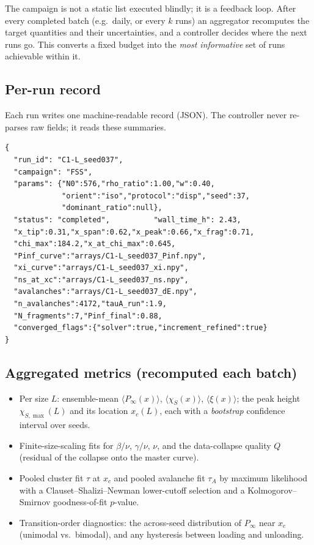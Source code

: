 \documentclass[11pt]{article}
\newcommand{\Pinf}{P_\infty}
\newcommand{\xc}{x_c}
\begin{document}
The campaign is not a static list executed blindly; it is a feedback loop. After every
completed batch (e.g.\ daily, or every $k$ runs) an aggregator recomputes the target
quantities and their uncertainties, and a controller decides where the next runs go.
This converts a fixed budget into the \emph{most informative} set of runs achievable
within it.

\subsection{Per-run record}

Each run writes one machine-readable record (JSON). The controller never re-parses raw
fields; it reads these summaries.
\begin{verbatim}
{
  "run_id": "C1-L_seed037",
  "campaign": "FSS",
  "params": {"N0":576,"rho_ratio":1.00,"w":0.40,
             "orient":"iso","protocol":"disp","seed":37,
             "dominant_ratio":null},
  "status": "completed",          "wall_time_h": 2.43,
  "x_tip":0.31,"x_span":0.62,"x_peak":0.66,"x_frag":0.71,
  "chi_max":184.2,"x_at_chi_max":0.645,
  "Pinf_curve":"arrays/C1-L_seed037_Pinf.npy",
  "xi_curve":"arrays/C1-L_seed037_xi.npy",
  "ns_at_xc":"arrays/C1-L_seed037_ns.npy",
  "avalanches":"arrays/C1-L_seed037_dE.npy",
  "n_avalanches":4172,"tauA_run":1.9,
  "N_fragments":7,"Pinf_final":0.88,
  "converged_flags":{"solver":true,"increment_refined":true}
}
\end{verbatim}

\subsection{Aggregated metrics (recomputed each batch)}

\begin{itemize}
\item Per size $L$: ensemble-mean $\langle\Pinf(x)\rangle$, $\langle\chi_S(x)\rangle$,
$\langle\xi(x)\rangle$; the peak height $\chi_{S,\max}(L)$ and its location
$x_c(L)$, each with a \emph{bootstrap} confidence interval over seeds.
\item Finite-size-scaling fits for $\beta/\nu$, $\gamma/\nu$, $\nu$, and the
data-collapse quality $Q$ (residual of the collapse onto the master curve).
\item Pooled cluster fit $\tau$ at $\xc$ and pooled avalanche fit $\tau_A$ by maximum
likelihood with a Clauset--Shalizi--Newman lower-cutoff selection and a
Kolmogorov--Smirnov goodness-of-fit $p$-value.
\item Transition-order diagnostics: the across-seed distribution of $\Pinf$ near $\xc$
(unimodal vs.\ bimodal), and any hysteresis between loading and unloading.
\end{itemize}
\end{document}
